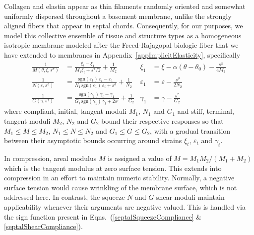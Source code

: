Collagen and elastin appear as thin filaments randomly oriented and somewhat uniformly dispersed throughout a basement membrane, unlike the strongly aligned fibers that appear in septal chords.  Consequently, for our purposes, we model this collective ensemble of tissue and structure types as a homo\-geneous isotropic membrane modeled after the Freed-Rajagopal biologic fiber \cite{FreedRajagopal16} that we have extended to membranes in Appendix~\ref{appImplicitElasticity}, specifically
\begin{subequations}
    \label{septalCompliances}
    \begin{align}
    \frac{1}{M(\theta, \xi, s^{\pi})} & = 
    \frac{\xi_t - \xi_1}{M_1 \xi_t + s^{\pi} / 2} + \frac{1}{M_2} 
    & \xi_1 & = \xi - \alpha (\theta - \theta_0) - \frac{s^{\pi}}{4M_2}
    \label{septalDilationCompliance} \\
    \frac{1}{N(\varepsilon , s^{\sigma})} & = \frac{ \mathrm{sgn} (\varepsilon_1) \, \varepsilon_t - \varepsilon_1}{N_1 \, \mathrm{sgn} (\varepsilon_1) \, \varepsilon_t + s^{\sigma}} + \frac{1}{N_2} &
    \varepsilon_1 & = \varepsilon - \frac{s^{\sigma}}{2N_2}
    \label{septalSqueezeCompliance} \\
    \frac{1}{G(\gamma , s^{\tau})} & = \frac{ \mathrm{sgn} (\gamma_1) \, \gamma_t - \gamma_1}{G_1 \, \mathrm{sgn} (\gamma_1) \, \gamma_t + 2 s^{\tau}} + \frac{1}{G_2} & 
    \gamma_1 & = \gamma - \frac{s^{\tau}}{G_2}
    \label{septalShearCompliance}
    \end{align}
\end{subequations}
where compliant, initial, tangent moduli $M_1$, $N_1$ and $G_1$ and stiff, terminal, tangent moduli $M_2$, $N_2$ and $G_2$ bound their respective responses so that $M_1 \leq M \leq M_2$, $N_1 \leq N \leq N_2$ and $G_1 \leq G \leq G_2$, with a gradual transition between their asymp\-totic bounds occurring around strains $\xi_t$, $\varepsilon_t$ and $\gamma_t$.

In compression, areal modulus $M$ is assigned a value of $M = M_1 M_2 / ( M_1 + M_2 )$ which is the tangent modulus at zero surface tension.  This extends into compression in an effort to maintain numeric stability.  Normally, a negative surface tension would cause wrinkling of the membrane surface, which is not addressed here.  In contrast, the squeeze $N$ and $G$ shear moduli maintain applicability whenever their arguments are negative valued.  This is handled via the sign function present in Eqns.~(\ref{septalSqueezeCompliance} \& \ref{septalShearCompliance}).

